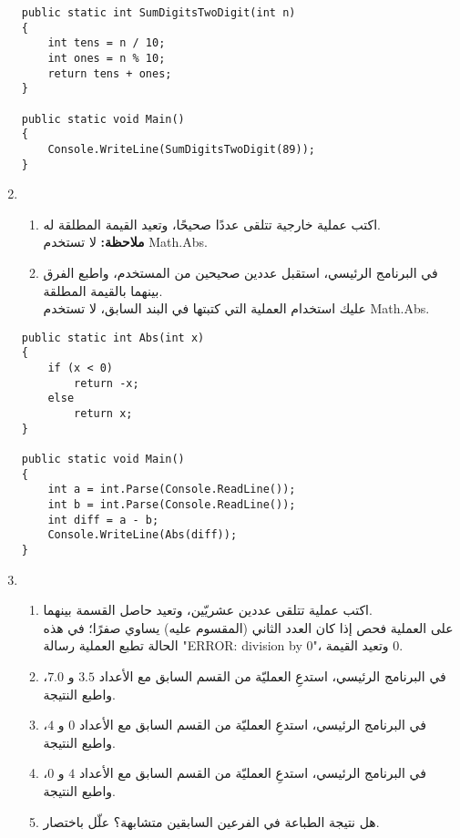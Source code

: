 \documentclass[14pt]{extarticle}
\begin{document}
\begin{enumerate}[itemsep=3em]
\ifwithsols
\begin{boxSolution}
\begin{english}
\begin{verbatim}
public static int SumDigitsTwoDigit(int n)
{
    int tens = n / 10;
    int ones = n % 10;
    return tens + ones;
}

public static void Main()
{
    Console.WriteLine(SumDigitsTwoDigit(89));
}
\end{verbatim}
\end{english}
\end{boxSolution}
\clearpage
\fi

\item
\begin{enumerate}
\item اكتب عملية خارجية تتلقى عددًا صحيحًا، وتعيد القيمة المطلقة له.\\
\textbf{ملاحظة:} لا تستخدم \textenglish{Math.Abs}.
\item في البرنامج الرئيسي، استقبل عددين صحيحين من المستخدم، واطبع الفرق بينهما بالقيمة المطلقة.\\
عليك استخدام العملية التي كتبتها في البند السابق، لا تستخدم \textenglish{Math.Abs}.
\end{enumerate}

\ifwithsols
\begin{boxSolution}
\begin{english}
\begin{verbatim}
public static int Abs(int x)
{
    if (x < 0)
        return -x;
    else
        return x;
}

public static void Main()
{
    int a = int.Parse(Console.ReadLine());
    int b = int.Parse(Console.ReadLine());
    int diff = a - b;
    Console.WriteLine(Abs(diff));
}
\end{verbatim}
\end{english}
\end{boxSolution}
\fi

\clearpage
\item
\begin{enumerate}
\item اكتب عملية تتلقى عددين عشريّين، وتعيد حاصل القسمة بينهما.\\
على العملية فحص إذا كان العدد الثاني (المقسوم عليه) يساوي صفرًا؛ في هذه الحالة تطبع العملية رسالة
\textenglish{"ERROR: division by 0"}، وتعيد القيمة $0$.
\item في البرنامج الرئيسي، استدعِ العمليّة من القسم السابق مع الأعداد $3.5$ و $7.0$، واطبع النتيجة.
\item في البرنامج الرئيسي، استدعِ العمليّة من القسم السابق مع الأعداد $0$ و $4$، واطبع النتيجة.
\item في البرنامج الرئيسي، استدعِ العمليّة من القسم السابق مع الأعداد $4$ و $0$، واطبع النتيجة.
\item هل نتيجة الطباعة في الفرعين السابقين متشابهة؟ علّل باختصار.
\end{enumerate}


\end{enumerate}
\end{document}
